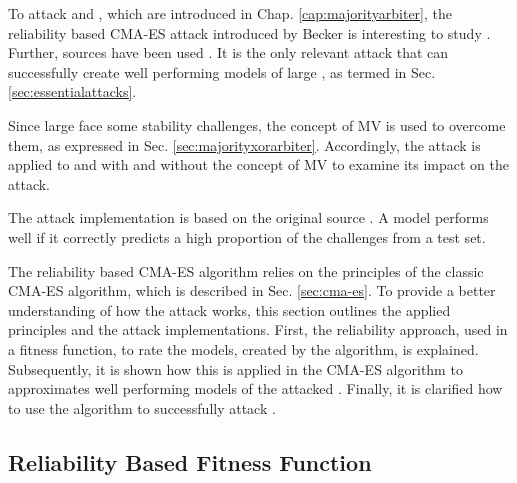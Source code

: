 To attack \mpufs and \mxpufs, which are introduced in Chap. \ref{cap:majorityarbiter}, the reliability based \ac{CMA-ES} attack introduced by Becker is interesting to study \cite{Becker2015ThePUFs}.
Further, sources have been used \cite{Becker2015ThePUFs,Wikipedia2017CMA-ES, Hansen2011TheTutorial, Hansen2006TheReview}. %
It is the only relevant attack that can successfully create well performing models of large \xpufs, as termed in Sec. \ref{sec:essentialattacks}.

Since large \xpufs face some stability challenges, the concept of \ac{MV} is used to overcome them, as expressed in Sec. \ref{sec:majorityxorarbiter}.
Accordingly, the attack is applied to \apufs and \xpufs with and without the concept of \ac{MV} to examine its impact on the attack. %

The attack implementation is based on the original source \cite{Becker2015ThePUFs}.
A model performs well if it correctly predicts a high proportion of the challenges from a test set.

The reliability based \ac{CMA-ES} algorithm relies on the principles of the classic \ac{CMA-ES} algorithm, which is described in Sec. \ref{sec:cma-es}.
To provide a better understanding of how the attack works, this section outlines the applied principles and the attack implementations. %
First, the reliability approach, used in a fitness function, to rate the models, created by the algorithm, is explained.
Subsequently, it is shown how this is applied in the \ac{CMA-ES} algorithm to approximates well performing models of the attacked \apuf.
Finally, it is clarified how to use the algorithm to successfully attack \xpufs.


\subsection{Reliability Based Fitness Function}
\label{sec:reliability}

